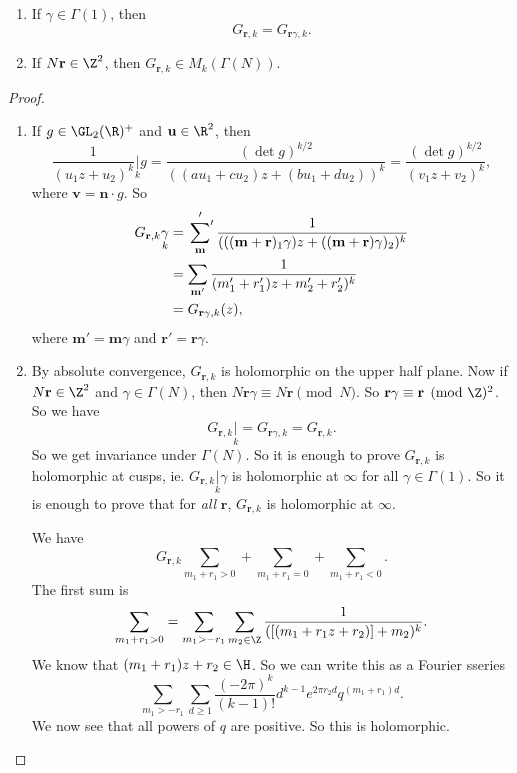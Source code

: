 \documentclass[a4paper]{article}
\begin{document}
\begin{thm}\leavevmode
  \begin{enumerate}
    \item If $\gamma \in \Gamma(1)$, then
      \[
        G_{\mathbf{r}, k} = G_{\mathbf{r} \gamma, k}.
      \]
    \item If $N\mathbf{r} \in \Z^2$, then $G_{\mathbf{r}, k} \in M_k(\Gamma(N))$.
  \end{enumerate}
\end{thm}

\begin{proof}\leavevmode
  \begin{enumerate}
    \item If $g \in \GL_2(\R)^+$ and $\mathbf{u} \in \R^2$, then
      \[
        \frac{1}{(u_1 z + u_2)^k} \underset{k}{|} g = \frac{(\det g)^{k/2}}{ ((au_1 + cu_2) z + (bu_1 + d u_2))^k} = \frac{(\det g)^{k/2}}{(v_1 z + v_2)^k},
      \]
      where $\mathbf{v} = \mathbf{n}\cdot g$. So
      \begin{align*}
        G_{\mathbf{r}, k} \underset{k}{\gamma} &= \sideset{}{'}\sum_{\mathbf{m}}'\frac{1}{(((\mathbf{m} + \mathbf{r})_1 \gamma) z + ((\mathbf{m} + \mathbf{r})\gamma)_2)^k} \\
        &= \sum_{\mathbf{m}'} \frac{1}{(m_1' + r_1') z + m_2' + r_2')^k}\\
        &= G_{\mathbf{r} \gamma, k}(z),
      \end{align*}
      where $\mathbf{m}' = \mathbf{m} \gamma$ and $\mathbf{r}' = \mathbf{r} \gamma$.
    \item By absolute convergence, $G_{\mathbf{r}, k}$ is holomorphic on the upper half plane. Now if $N\mathbf{r} \in \Z^2$ and $\gamma \in \Gamma(N)$, then $N\mathbf{r} \gamma \equiv N\mathbf{r} \pmod N$. So $\mathbf{r} \gamma \equiv \mathbf{r} \pmod \Z^2$. So we have
      \[
        G_{\mathbf{r}, k}\underset{k}{|} = G_{\mathbf{r} \gamma, k} = G_{\mathbf{r}, k}.
      \]
      So we get invariance under $\Gamma(N)$. So it is enough to prove $G_{\mathbf{r}, k}$ is holomorphic at cusps, ie. $G_{\mathbf{r}, k}\underset{k}{|} \gamma$ is holomorphic at $\infty$ for all $\gamma \in \Gamma(1)$. So it is enough to prove that for \emph{all} $\mathbf{r}$, $G_{\mathbf{r}, k}$ is holomorphic at $\infty$.

      We have
      \[
        G_{\mathbf{r}, k} \sum_{m_1 + r_1 > 0} + \sum_{m_1 + r_1 = 0} + \sum_{m_1 + r_1 < 0}.
      \]
      The first sum is
      \[
        \sum_{m_1 + r_1 > 0} = \sum_{m_1 > - r_1} \sum_{m_2 \in \Z} \frac{1}{([(m_1 + r_1 z + r_2)] + m_2)^k}.
      \]
      We know that $(m_1 + r_1)z + r_2 \in \H$. So we can write this as a Fourier sseries
      \[
        \sum_{m_1 > -r_1} \sum_{d \geq 1} \frac{(-2\pi)^k}{(k - 1)!} d^{k - 1} e^{2\pi r_2 d} q^{(m_1 + r_1) d}.
      \]
      We now see that all powers of $q$ are positive. So this is holomorphic.


\end{enumerate}
\end{proof}
\end{document}
